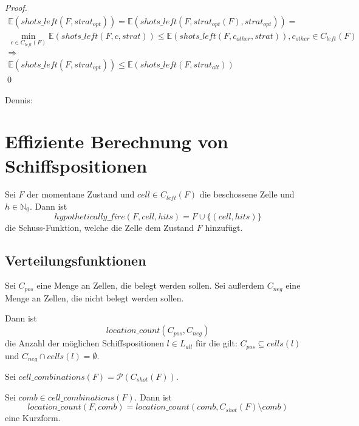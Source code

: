 \documentclass[a4paper,12pt]{llncs}
\newcommand{\N}{{\mathbb{N}}}
\numberwithin{equation}{section}
\begin{document}
\begin{proof}
\begin{align}
\mathds{E}(shots\_left(F, strat_{opt})) =\mathds{E}(shots\_left(F, strat_{opt}(F), strat_{opt}))=\\
\min_{c \in C_{left}(F)} \mathds{E}(shots\_left(F, c, strat)) \leq \mathds{E}(shots\_left(F, c_{other}, strat)), c_{other} \in C_{left}(F)\\
\Rightarrow\\
\mathds{E}(shots\_left(F, strat_{opt})) \leq \mathds{E}(shots\_left(F, strat_{alt}))
\end{align}
\qed
\end{proof}

\newpage

Dennis:

\section{Effiziente Berechnung von Schiffspositionen}


\begin{definition}
Sei $F$ der momentane Zustand und $cell \in C_{left}(F)$ die beschossene Zelle und $h \in \N_0$.
Dann ist
\[
hypothetically\_fire(F, cell, hits)=F \cup \{(cell,hits)\}
\]
die Schuss-Funktion, welche die Zelle dem Zustand $F$ hinzufügt.
\end{definition}

\subsection{Verteilungsfunktionen}

\begin{definition}
Sei $C_{pos}$ eine Menge an Zellen, die belegt werden sollen. Sei außerdem $C_{neg}$ eine Menge an Zellen, die nicht belegt werden sollen.

Dann ist
\[
location\_count(C_{pos}, C_{neg})
\]
die Anzahl der möglichen Schiffspositionen $l \in L_{all}$ für die gilt: $C_{pos} \subseteq cells(l)$ und $C_{neg} \cap cells(l) = \emptyset$.
\end{definition}

\begin{definition}
Sei $cell\_combinations(F)=\mathcal{P}(C_{shot}(F))$.
\end{definition}

\begin{definition}
Sei $comb \in cell\_combinations(F)$. Dann ist
\[
location\_count(F,comb)=location\_count(comb, C_{shot}(F) \setminus comb)
\]
eine Kurzform.
\end{definition}
\end{document}
